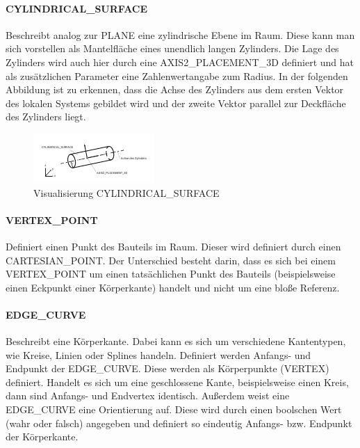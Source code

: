 \paragraph{CYLINDRICAL\_SURFACE}


Beschreibt analog zur PLANE eine zylindrische Ebene im Raum. Diese kann man sich vorstellen als Mantelfläche eines unendlich langen Zylinders. Die Lage des Zylinders wird auch hier durch eine AXIS2\_PLACEMENT\_3D definiert und hat als zusätzlichen Parameter eine Zahlenwertangabe zum Radius. In der folgenden Abbildung ist zu erkennen, dass die Achse des Zylinders aus dem ersten Vektor des lokalen Systems gebildet wird und der zweite Vektor parallel zur Deckfläche des Zylinders liegt.

\begin{figure}[h]
	\centering
	
	\includegraphics[width=0.7\linewidth]{img/cylinder_entity.pdf}
	
	\caption{Visualisierung CYLINDRICAL\_SURFACE}
	
\end{figure}

\paragraph{VERTEX\_POINT}

Definiert einen Punkt des Bauteils im Raum. Dieser wird definiert durch einen CARTESIAN\_POINT. Der Unterschied besteht darin, dass es sich bei einem VERTEX\_POINT um einen tatsächlichen Punkt des Bauteils (beispielsweise einen Eckpunkt einer Körperkante) handelt und nicht um eine bloße Referenz.   

\paragraph{EDGE\_CURVE}

Beschreibt eine Körperkante. Dabei kann es sich um verschiedene Kantentypen, wie Kreise, Linien oder Splines  handeln. Definiert werden Anfangs- und Endpunkt der EDGE\_CURVE. Diese werden als Körperpunkte (VERTEX) definiert. Handelt es sich um eine geschlossene Kante, beispielsweise einen Kreis, dann sind Anfangs- und Endvertex identisch. Außerdem weist eine EDGE\_CURVE eine Orientierung auf. Diese wird durch einen boolschen Wert (wahr oder falsch) angegeben und definiert so eindeutig Anfangs- bzw. Endpunkt der Körperkante.   

